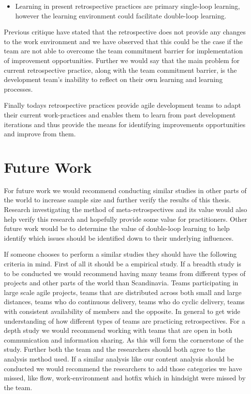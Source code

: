 \begin{itemize}
\item Learning in present retrospective practices are primary single-loop learning, however the learning environment could facilitate double-loop learning.
\end{itemize}

Previous critique \cite{Drury2012} have stated that the retrospective does not provide any changes to the work environment and we have observed that this could be the case if the team are not able to overcome the team commitment barrier for implementation of improvement opportunities. Further we would say that the main problem for current retrospective practice, along with the team commitment barrier, is the development team's inability to reflect on their own learning and learning processes. 

Finally todays retrospective practices provide agile development teams to adapt their current work-practices and enables them to learn from past development iterations and thus provide the means for identifying improvements opportunities and improve from them. 

\section{Future Work}
For future work we would recommend conducting similar studies in other parts of the world to increase sample size and further verify the results of this thesis. Research investigating the method of meta-retrospectives and its value would also help verify this research and hopefully provide some value for practitioners. Other future work would be to determine the value of double-loop learning to help identify which issues should be identified down to their underlying influences. 

If someone chooses to perform a similar studies they should have the following criteria in mind. First of all it should be a empirical study\cite{Dyba2008}. If a breadth study is to be conducted we would recommend having many teams from different types of projects and other parts of the world than Scandinavia. Teams participating in large scale agile projects, teams that are distributed across both small and large distances, teams who do continuous delivery, teams who do cyclic delivery, teams with consistent availability of members and the opposite. In general to get wide understanding of how different types of teams are practicing retrospectives. For a depth study we would recommend working with teams that are open in both communication and information sharing. As this will form the cornerstone of the study. Further both the team and the researchers should both agree to the analysis method used. If a similar analysis like our content analysis should be conducted we would recommend the researchers to add those categories we have missed, like flow, work-environment and hotfix which in hindsight were missed by the team. 

